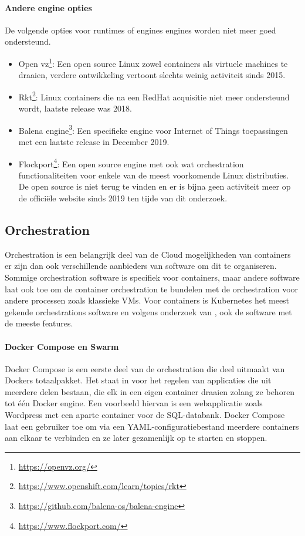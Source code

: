 \paragraph{Andere engine opties}
De volgende opties voor runtimes of engines engines worden niet meer goed ondersteund.
\begin{itemize}
    \item Open vz\footnote{\url{https://openvz.org/}}: Een open source Linux zowel containers als virtuele machines te draaien, verdere ontwikkeling vertoont slechts weinig activiteit sinds 2015.
    \item Rkt\footnote{\url{https://www.openshift.com/learn/topics/rkt}}: Linux containers die na een RedHat acquisitie niet meer ondersteund wordt, laatste release was 2018.
    \item Balena engine\footnote{\url{https://github.com/balena-os/balena-engine}}: Een specifieke engine voor Internet of Things toepassingen met een laatste release in December 2019.
    \item Flockport\footnote{\url{https://www.flockport.com/}}: Een open source engine met ook wat orchestration functionaliteiten voor enkele van de meest voorkomende Linux distributies. De open source is niet terug te vinden en er is bijna geen activiteit meer op de officiële website sinds 2019 ten tijde van dit onderzoek.
\end{itemize}


\subsection{Orchestration}
Orchestration is een belangrijk deel van de Cloud mogelijkheden van containers er zijn dan ook verschillende aanbieders van software om dit te organiseren. Sommige orchestration software is specifiek voor containers, maar andere software laat ook toe om de container orchestration te bundelen met de orchestration voor andere processen zoals klassieke VMs. Voor containers is Kubernetes het meest gekende orchestrations software en volgens onderzoek van \textcite{Truyen2019}, ook de software met de meeste features. 
\paragraph{Docker Compose en Swarm}
Docker Compose is een eerste deel van de orchestration die deel uitmaakt van Dockers totaalpakket. Het staat in voor het regelen van applicaties die uit meerdere delen bestaan, die elk in een eigen container draaien zolang ze behoren tot één Docker engine. Een voorbeeld hiervan is een webapplicatie zoals Wordpress met een aparte container voor de SQL-databank. Docker Compose laat een gebruiker toe om via een YAML-configuratiebestand meerdere containers aan elkaar te verbinden en ze later gezamenlijk op te starten en stoppen.

